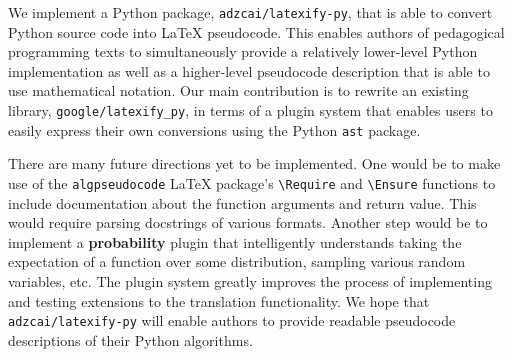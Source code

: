 \documentclass{article}
\newcommand{\ourpkg}{\texttt{adzcai/latexify-py}}
\newcommand{\theirpkg}{\texttt{google/latexify\_py}}
\newcommand{\vocab}[1]{\textbf{#1}}
\begin{document}
We implement a Python package, \ourpkg{}, that is able to convert Python source code into \LaTeX{} pseudocode.
This enables authors of pedagogical programming texts to simultaneously provide a relatively lower-level Python implementation
as well as a higher-level pseudocode description that is able to use mathematical notation.
Our main contribution is to rewrite an existing library, \theirpkg{},
in terms of a plugin system that enables users to easily express their own conversions using the Python \verb|ast| package.

There are many future directions yet to be implemented.
One would be to make use of the \verb|algpseudocode| \LaTeX{} package's \verb|\Require| and \verb|\Ensure| functions
to include documentation about the function arguments and return value.
This would require parsing docstrings of various formats.
Another step would be to implement a \vocab{probability} plugin
that intelligently understands taking the expectation of a function over some distribution,
sampling various random variables, etc.
The plugin system greatly improves the process of implementing and testing extensions to the translation functionality.
We hope that \ourpkg{} will enable authors to provide readable pseudocode descriptions of their Python algorithms.
\end{document}
